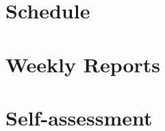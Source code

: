 \documentclass[11pt, english, screen, research-development]{report-rd-info}
\begin{document}
%

%

\chapter{Schedule}



\chapter{Weekly Reports}



\chapter{Self-assessment}

\end{document}
